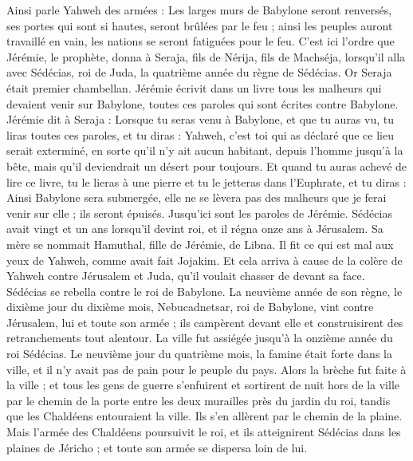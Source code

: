 \begin{multicols}{2}
Ainsi parle Yahweh des armées : Les larges murs de Babylone seront renversés, ses portes qui sont si hautes, seront brûlées par le feu ; ainsi les peuples auront travaillé en vain, les nations se seront fatiguées pour le feu.
C'est ici l'ordre que Jérémie, le prophète, donna à Seraja, fils de Nérija, fils de Machséja, lorsqu'il alla avec Sédécias, roi de Juda, la quatrième année du règne de Sédécias. Or Seraja était premier chambellan.
Jérémie écrivit dans un livre tous les malheurs qui devaient venir sur Babylone, toutes ces paroles qui sont écrites contre Babylone.
Jérémie dit à Seraja : Lorsque tu seras venu à Babylone, et que tu auras vu, tu liras toutes ces paroles,
et tu diras : Yahweh, c'est toi qui as déclaré que ce lieu serait exterminé, en sorte qu'il n'y ait aucun habitant, depuis l'homme jusqu'à la bête, mais qu'il deviendrait un désert pour toujours.
Et quand tu auras achevé de lire ce livre, tu le lieras à une pierre et tu le jetteras dans l'Euphrate,
et tu diras : Ainsi Babylone sera submergée, elle ne se lèvera pas des malheurs que je ferai venir sur elle ; ils seront épuisés. Jusqu'ici sont les paroles de Jérémie.
\VerseOne{}Sédécias avait vingt et un ans lorsqu'il devint roi, et il régna onze ans à Jérusalem. Sa mère se nommait Hamuthal, fille de Jérémie, de Libna.
Il fit ce qui est mal aux yeux de Yahweh, comme avait fait Jojakim.
Et cela arriva à cause de la colère de Yahweh contre Jérusalem et Juda, qu'il voulait chasser de devant sa face. Sédécias se rebella contre le roi de Babylone.
La neuvième année de son règne, le dixième jour du dixième mois, Nebucadnetsar, roi de Babylone, vint contre Jérusalem, lui et toute son armée ; ils campèrent devant elle et construisirent des retranchements tout alentour.
La ville fut assiégée jusqu'à la onzième année du roi Sédécias.
Le neuvième jour du quatrième mois, la famine était forte dans la ville, et il n'y avait pas de pain pour le peuple du pays.
Alors la brèche fut faite à la ville ; et tous les gens de guerre s'enfuirent et sortirent de nuit hors de la ville par le chemin de la porte entre les deux murailles près du jardin du roi, tandis que les Chaldéens entouraient la ville. Ils s'en allèrent par le chemin de la plaine.
Mais l'armée des Chaldéens poursuivit le roi, et ils atteignirent Sédécias dans les plaines de Jéricho ; et toute son armée se dispersa loin de lui.

\end{multicols}
